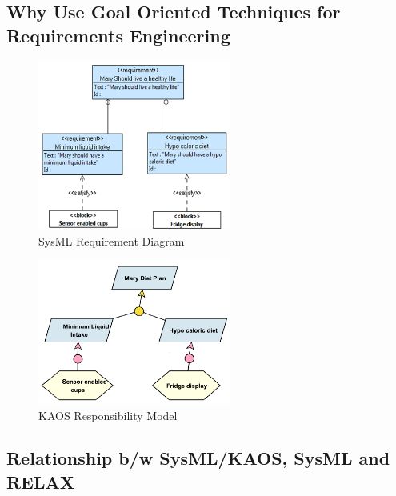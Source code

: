 \documentclass[10pt, conference, compsocconf]{IEEEtran}
\begin{document}
\subsection{Why Use Goal Oriented Techniques for Requirements Engineering}


\begin{figure}[!t]
\centering
\includegraphics[width=2.5in]{fig14}
\caption{SysML Requirement Diagram}
\label{fig:ReqDiag}
\end{figure}

\begin{figure}[!t]
\centering
\includegraphics[width=2.5in]{fig12}
\caption{KAOS Responsibility Model}
\label{fig:KAOSModel}
\end{figure}

\subsection{Relationship b/w SysML/KAOS, SysML and RELAX}
\end{document}

